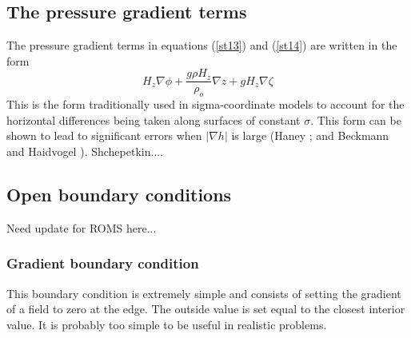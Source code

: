 \subsection{The pressure gradient terms}
\label{PG}
The pressure gradient terms in equations (\ref{st13}) and
(\ref{st14}) are written in the form
\begin{equation}
  H_z \nabla \phi + \frac{g \rho H_z}{\rho_o} \nabla z
  + g H_z \nabla \zeta
\label{prgs}
\end{equation}
This is the form traditionally used in sigma-coordinate models to
account for the horizontal differences being taken along surfaces of
constant $\sigma$.  This form can be shown to lead to significant
errors when $|\nabla h|$ is large (Haney \cite{Haney}; and Beckmann
and Haidvogel \cite{BH93}). Shchepetkin....

\subsection{Open boundary conditions}
Need update for ROMS here...

\subsubsection{Gradient boundary condition}
This boundary condition is extremely simple and consists of setting the
gradient of a field to zero at the edge. The outside value is set equal
to the closest interior value. It is probably too simple to be useful
in realistic problems.

